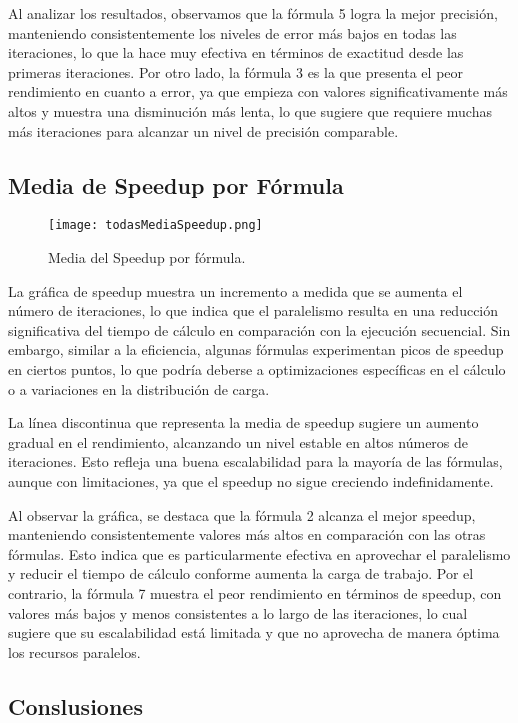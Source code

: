 \documentclass[conference, a4paper]{IEEEtran}
\begin{document}
Al analizar los resultados, observamos que la fórmula 5 logra la mejor precisión, manteniendo consistentemente los niveles de error más bajos en todas las iteraciones, lo que la hace muy efectiva en términos de exactitud desde las primeras iteraciones. Por otro lado, la fórmula 3 es la que presenta el peor rendimiento en cuanto a error, ya que empieza con valores significativamente más altos y muestra una disminución más lenta, lo que sugiere que requiere muchas más iteraciones para alcanzar un nivel de precisión comparable.

\subsection{Media de Speedup por Fórmula}

\begin{figure}[h!]
    \centering
    \texttt{[image: todasMediaSpeedup.png]}
    \caption{Media del Speedup por fórmula.}
    \label{fig:mediaError}
\end{figure}

La gráfica de speedup muestra un incremento a medida que se aumenta el número de iteraciones, lo que indica que el paralelismo resulta en una reducción significativa del tiempo de cálculo en comparación con la ejecución secuencial. Sin embargo, similar a la eficiencia, algunas fórmulas experimentan picos de speedup en ciertos puntos, lo que podría deberse a optimizaciones específicas en el cálculo o a variaciones en la distribución de carga.

La línea discontinua que representa la media de speedup sugiere un aumento gradual en el rendimiento, alcanzando un nivel estable en altos números de iteraciones. Esto refleja una buena escalabilidad para la mayoría de las fórmulas, aunque con limitaciones, ya que el speedup no sigue creciendo indefinidamente.

Al observar la gráfica, se destaca que la fórmula 2 alcanza el mejor speedup, manteniendo consistentemente valores más altos en comparación con las otras fórmulas. Esto indica que es particularmente efectiva en aprovechar el paralelismo y reducir el tiempo de cálculo conforme aumenta la carga de trabajo. Por el contrario, la fórmula 7 muestra el peor rendimiento en términos de speedup, con valores más bajos y menos consistentes a lo largo de las iteraciones, lo cual sugiere que su escalabilidad está limitada y que no aprovecha de manera óptima los recursos paralelos.

\subsection{Conslusiones}
\end{document}
